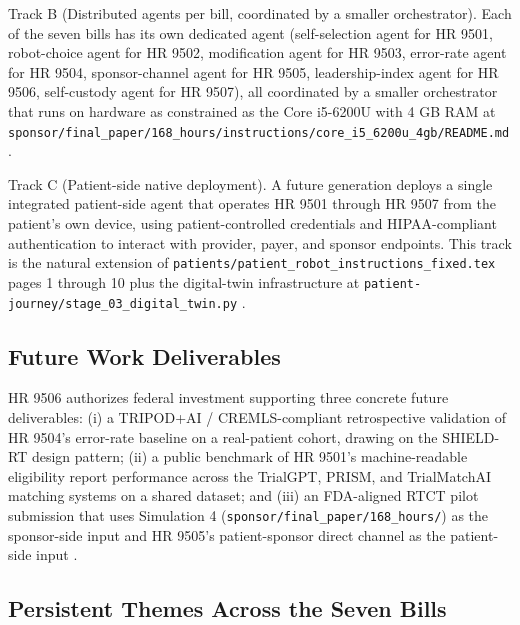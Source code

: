Track B (Distributed agents per bill, coordinated by a smaller
orchestrator). Each of the seven bills has its own dedicated agent
(self-selection agent for HR 9501, robot-choice agent for HR 9502,
modification agent for HR 9503, error-rate agent for HR 9504,
sponsor-channel agent for HR 9505, leadership-index agent for HR
9506, self-custody agent for HR 9507), all coordinated by a
smaller orchestrator that runs on hardware as constrained as the
Core i5-6200U with 4 GB RAM at
\texttt{sponsor/final\_paper/168\_hours/instructions/core\_i5\_6200u\_4gb/README.md}
\cite{kawchak_2026_19396256}.

Track C (Patient-side native deployment). A future generation
deploys a single integrated patient-side agent that operates HR
9501 through HR 9507 from the patient's own device, using
patient-controlled credentials and HIPAA-compliant authentication
to interact with provider, payer, and sponsor endpoints. This
track is the natural extension of
\texttt{patients/patient\_robot\_instructions\_fixed.tex} pages 1
through 10 plus the digital-twin infrastructure at
\texttt{patient-journey/stage\_03\_digital\_twin.py}
\cite{kawchak_2026_18810541, kawchak_2026_19119939}.

\subsection{Future Work Deliverables}

\hspace{0.5cm} HR 9506 authorizes federal investment supporting three concrete
future deliverables:
(i) a TRIPOD+AI / CREMLS-compliant retrospective validation of HR
9504's error-rate baseline on a real-patient cohort, drawing on the
SHIELD-RT design pattern;
(ii) a public benchmark of HR 9501's machine-readable eligibility
report performance across the TrialGPT, PRISM, and TrialMatchAI
matching systems on a shared dataset; and
(iii) an FDA-aligned RTCT pilot submission that uses Simulation 4
(\texttt{sponsor/final\_paper/168\_hours/}) as the sponsor-side input
and HR 9505's patient-sponsor direct channel as the patient-side
input \cite{fda_rtct_press_2026, kawchak_2026_19994945,
kawchak_2026_19396256, kawchak_2026_19119939}.

\subsection{Persistent Themes Across the Seven Bills}

